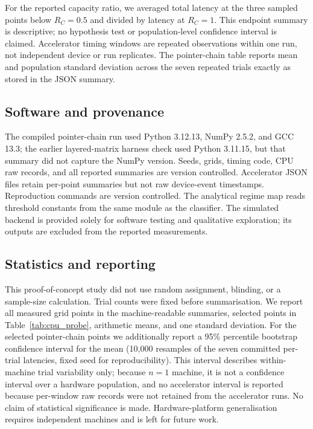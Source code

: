For the reported capacity ratio, we averaged total latency at the three sampled
points below $R_C=0.5$ and divided by latency at $R_C=1$. This endpoint summary
is descriptive; no hypothesis test or population-level confidence interval is
claimed. Accelerator timing windows are repeated observations within one run,
not independent device or run replicates. The pointer-chain table reports mean
and population standard deviation across the seven repeated trials exactly as
stored in the JSON summary.

\subsection*{Software and provenance}

The compiled pointer-chain run used Python 3.12.13, NumPy 2.5.2, and GCC 13.3;
the earlier layered-matrix harness check used Python 3.11.15, but that summary
did not capture the NumPy version. Seeds, grids, timing code, CPU raw records,
and all reported summaries are version controlled. Accelerator JSON files
retain per-point summaries but not raw device-event timestamps. Reproduction
commands are version controlled. The analytical regime
map reads threshold constants from the same module as the classifier. The
simulated backend is provided solely for software testing and qualitative
exploration; its outputs are excluded from the reported measurements.

\subsection*{Statistics and reporting}

This proof-of-concept study did not use random assignment, blinding, or a
sample-size calculation. Trial counts were fixed before summarisation. We
report all measured grid points in the machine-readable summaries, selected points
in Table~\ref{tab:cpu_probe}, arithmetic means, and one standard deviation. For
the selected pointer-chain points we additionally report a 95\% percentile
bootstrap confidence interval for the mean (10{,}000 resamples of the seven
committed per-trial latencies, fixed seed for reproducibility). This interval
describes within-machine trial variability only; because $n=1$ machine, it is
not a confidence interval over a hardware population, and no accelerator interval
is reported because per-window raw records were not retained from the accelerator
runs. No claim of statistical significance is made. Hardware-platform
generalisation requires independent machines and is left for future work.

